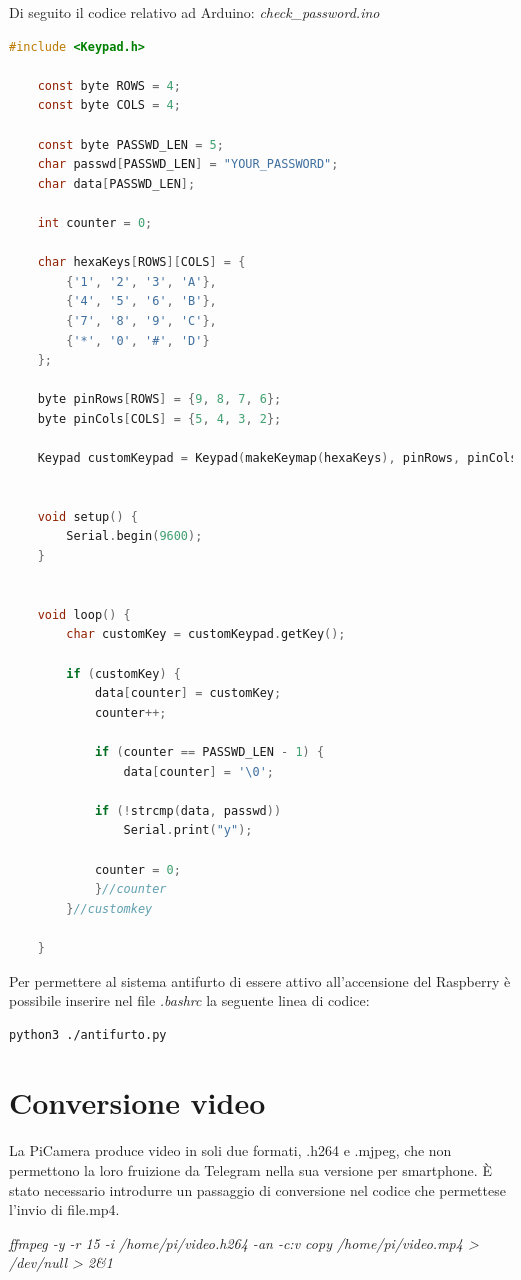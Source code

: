 \documentclass[12pt]{article}
\begin{document}
	Di seguito il codice relativo ad Arduino: \textit{check\_password.ino}
	\begin{lstlisting}[language=C]
	#include <Keypad.h>

	const byte ROWS = 4;
	const byte COLS = 4;

	const byte PASSWD_LEN = 5;
	char passwd[PASSWD_LEN] = "YOUR_PASSWORD";
	char data[PASSWD_LEN];

	int counter = 0;

	char hexaKeys[ROWS][COLS] = {
  		{'1', '2', '3', 'A'},
  		{'4', '5', '6', 'B'},
  		{'7', '8', '9', 'C'},
  		{'*', '0', '#', 'D'}
	};

	byte pinRows[ROWS] = {9, 8, 7, 6};
	byte pinCols[COLS] = {5, 4, 3, 2};

	Keypad customKeypad = Keypad(makeKeymap(hexaKeys), pinRows, pinCols, ROWS, COLS);


	void setup() {
  		Serial.begin(9600);
	}


	void loop() {
  		char customKey = customKeypad.getKey();
    
  		if (customKey) {  
    		data[counter] = customKey;
    		counter++;

    		if (counter == PASSWD_LEN - 1) {
      			data[counter] = '\0';
      
      		if (!strcmp(data, passwd))
        		Serial.print("y");    
    
     	 	counter = 0;
    		}//counter
  		}//customkey

	}	

	\end{lstlisting}
	
	Per permettere al sistema antifurto di essere attivo all'accensione del Raspberry è possibile
	inserire nel file \textit{.bashrc} la seguente linea di codice:
	
	\begin{lstlisting}[language=bash]
	python3 ./antifurto.py
	\end{lstlisting}
	
	
	\section{Conversione video}
	La PiCamera produce video in soli due formati, .h264 e .mjpeg, che non permettono la loro 
	fruizione da Telegram nella sua versione per smartphone. È stato necessario introdurre un 
	passaggio di conversione nel codice che permettese l'invio di file.mp4.

	\textit{ffmpeg -y -r 15 -i /home/pi/video.h264 -an -c:v copy /home/pi/video.mp4 > /dev/null > 2\&1}
\end{document}
